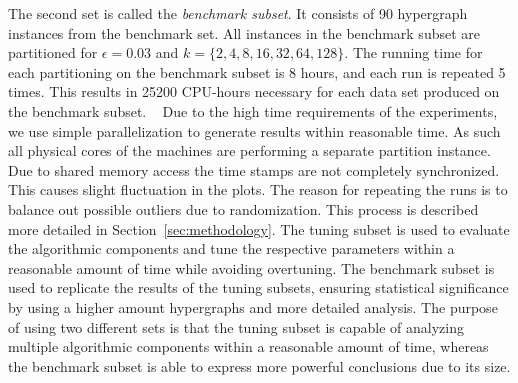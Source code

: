 \documentclass[a4paper,12pt,titlepage, BCOR7mm,headsepline]{scrbook}
\numberwithin{equation}{section}
\begin{document}
The second set is called the \emph{benchmark subset}. It consists of 90 hypergraph instances from the benchmark set. All instances in the benchmark subset are partitioned for $\epsilon = 0.03$ and $k = \{2,4,8,16,32,64,128\}$. The running time for each partitioning on the benchmark subset is 8 hours, and each run is repeated 5 times. This results in 25200 CPU-hours necessary for each data set produced on the benchmark subset.
\newline ~ \newline
Due to the high time requirements of the experiments, we use simple parallelization to generate results within reasonable time. As such all physical cores of the machines are performing a separate partition instance. Due to shared memory access the time stamps are not completely synchronized. This causes slight fluctuation in the plots. 
The reason for repeating the runs is to balance out possible outliers due to randomization. This process is described more detailed in Section~\ref{sec:methodology}.
The tuning subset is used to evaluate the algorithmic components and tune the respective parameters within a reasonable amount of time while avoiding overtuning. 
The benchmark subset is used to replicate the results of the tuning subsets, ensuring statistical significance by using a higher amount hypergraphs and more detailed analysis. 
The purpose of using two different sets is that the tuning subset is capable of analyzing multiple algorithmic components within a reasonable amount of time, whereas the benchmark subset is able to express more powerful conclusions due to its size.
\end{document}
